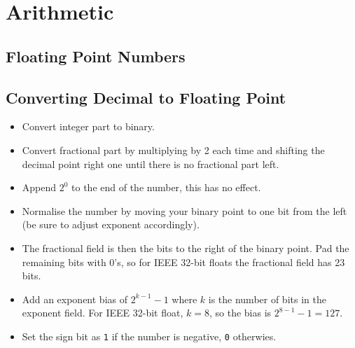 \section{Arithmetic}

\subsection{Floating Point Numbers}
\begin{figure}[H]
\centering
{}    
\end{figure}

\subsection{Converting Decimal to Floating Point}
\begin{itemize}
    \item Convert integer part to binary.
    \item Convert fractional part by multiplying by 2 each time and shifting the decimal point right one until there is no fractional part left.
    \item Append $2^0$ to the end of the number, this has no effect.
    \item Normalise the number by moving your binary point to one bit from the left (be sure to adjust exponent accordingly).
    \item The fractional field is then the bits to the right of the binary point. Pad the remaining bits with 0's, so for IEEE 32-bit floats the fractional field has 23 bits.
    \item Add an exponent bias of $2^{k-1}-1$ where $k$ is the number of bits in the exponent field. For IEEE 32-bit float, $k=8$, so the bias is $2^{8-1}-1=127$. 
    \item Set the sign bit as \texttt{1} if the number is negative, \texttt{0} otherwies.
\end{itemize}

